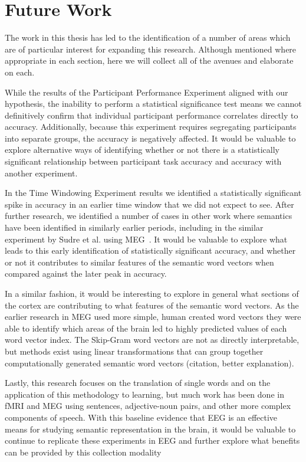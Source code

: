 \section{Future Work}

The work in this thesis has led to the identification of a number of areas 
which are of particular interest for expanding this research. Although 
mentioned where appropriate in each section, here we will collect all of the 
avenues and elaborate on each.

While the results of the Participant Performance Experiment aligned with our 
hypothesis, the inability to perform a statistical significance test means we 
cannot definitively confirm that individual participant performance correlates 
directly to \tvt accuracy. Additionally, because this experiment requires 
segregating participants into separate groups, the \tvt accuracy is negatively 
affected. It would be valuable to explore alternative ways of identifying 
whether or not there is a statistically significant relationship between 
participant task accuracy and \tvt accuracy with another experiment.

In the Time Windowing Experiment results we identified a statistically 
significant spike in \tvt accuracy in an earlier time window that we did not 
expect to see. After further research, we identified a number of cases in other 
work where semantics have been identified in similarly earlier periods, 
including in the similar experiment by Sudre et al. using MEG~\cite{sudre2012}.
It would be valuable to explore what leads to this early identification of 
statistically significant accuracy, and whether or not it contributes to 
similar features of the semantic word vectors when compared against the later 
peak in accuracy.

In a similar fashion, it would be interesting to explore in general what 
sections of the cortex are contributing to what features of the semantic word 
vectors. As the earlier research in MEG used more simple, human created word 
vectors they were able to identify which areas of the brain led to highly 
predicted values of each word vector index. The Skip-Gram word vectors are not 
as directly interpretable, but methods exist using linear transformations that 
can group together computationally generated semantic word vectors (citation, 
better explanation).

Lastly, this research focuses on the translation of single words and on the 
application of this methodology to learning, but much work has been done in 
fMRI and MEG using sentences, adjective-noun pairs, and other more complex 
components of speech. With this baseline evidence that EEG is an effective 
means for studying semantic representation in the brain, it would be valuable 
to continue to replicate these experiments in EEG and further explore what 
benefits can be provided by this collection modality
